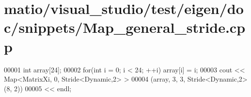 \hypertarget{matio_2visual__studio_2test_2eigen_2doc_2snippets_2_map__general__stride_8cpp_source}{}\section{matio/visual\+\_\+studio/test/eigen/doc/snippets/\+Map\+\_\+general\+\_\+stride.cpp}
\label{matio_2visual__studio_2test_2eigen_2doc_2snippets_2_map__general__stride_8cpp_source}

\begin{DoxyCode}
00001 \textcolor{keywordtype}{int} array[24];
00002 \textcolor{keywordflow}{for}(\textcolor{keywordtype}{int} i = 0; i < 24; ++i) array[i] = i;
00003 cout << Map<MatrixXi, 0, Stride<Dynamic,2> >
00004          (array, 3, 3, Stride<Dynamic,2>(8, 2))
00005      << endl;
\end{DoxyCode}
